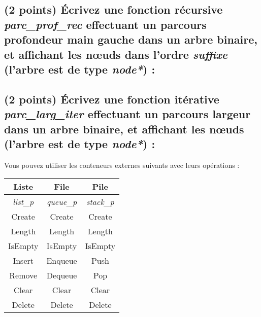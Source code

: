 \documentclass[11pt,a4paper]{article}
\begin{document}

\subsection{(2 points) \'Ecrivez une fonction récursive \og \textit{parc\_prof\_rec} \fg{} effectuant un parcours profondeur main gauche dans un arbre binaire, et affichant les nœuds dans l'ordre \textit{suffixe} (l'arbre est de type \textit{node*}) : }

\begin{center}
\end{center}


\clearpage


\subsection{(2 points) \'Ecrivez une fonction itérative \og \textit{parc\_larg\_iter} \fg{} effectuant un parcours largeur dans un arbre binaire, et affichant les nœuds (l'arbre est de type \textit{node*}) : }

\begin{center}

Vous pouvez utiliser les conteneurs externes suivants avec leurs opérations :

\medskip

\begin{tabular}{ |c|c|c| }
\hline
\textbf{Liste}    & \textbf{File}     & \textbf{Pile} \\ \hline
\textit{list\_p}  & \textit{queue\_p} & \textit{stack\_p} \\ \hline
Create  & Create  & Create  \\ \hline
Length  & Length  & Length  \\ \hline
IsEmpty & IsEmpty & IsEmpty \\ \hline
Insert  & Enqueue & Push    \\ \hline
Remove  & Dequeue & Pop     \\ \hline
Clear   & Clear   & Clear   \\ \hline
Delete  & Delete  & Delete  \\ \hline
\end{tabular}

\medskip

\end{center}
\end{document}
